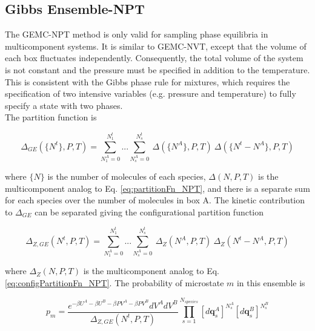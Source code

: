 \subsection{Gibbs Ensemble-NPT} 
\label{sec:gibbs_npt}

The GEMC-NPT method is only valid for sampling phase equilibria in multicomponent systems. 
It is similar to GEMC-NVT, except that the volume of each box fluctuates independently.
Consequently, the total volume of the system is not constant and the 
pressure must be specified in addition to the temperature.
This is consistent with the Gibbs phase rule for mixtures, which requires the specification of two intensive
variables (e.g. pressure and temperature) to fully specify a state with two phases. \\

The partition function is

\begin{equation}
\Delta_{GE}\left(\{N^t\},P,T\right) = \sum^{N^t_1}_{N^A_1=0} ... \sum^{N^t_s}_{N^A_s=0} 
                                    \ \Delta(\{N^A\},P,T)\ \Delta(\{N^t-N^A\},P,T)
\label{eq:partitionFn_GENPT}
\end{equation}

where $\{N\}$ is the number of molecules of each species,
$\Delta({N},P,T)$ is the multicomponent analog to Eq. \ref{eq:partitionFn_NPT}, and
there is a separate sum for each species over the number of molecules in box A.
The kinetic contribution to $\Delta_{GE}$ can be separated giving the configurational partition function

\begin{equation}
\Delta_{Z,GE}\left({N^t},P,T\right) = \sum^{N^t_1}_{N^A_1=0} ... \sum^{N^t_s}_{N^A_s=0} 
                                    \ \Delta_Z({N^A},P,T)\ \Delta_Z({N^t-N^A},P,T)
\label{eq:configPartitionFn_GENPT}
\end{equation}

where $\Delta_Z({N},P,T)$ is the multicomponent analog to Eq. \ref{eq:configPartitionFn_NPT}.
The probability of microstate $m$ in this ensemble is

\begin{equation}
p_m = \frac{e^{-\beta U^A -\beta U^B - \beta P V^A - \beta P V^B} dV^A dV^B}{\Delta_{Z,GE}({N^t},P,T)} 
      \prod_{s=1}^{N_{species}} \left[ d\mathbf{q}_s^{A} \right]^{N_s^A}
                                \left[ d\mathbf{q}_s^{B} \right]^{N_s^B}
\label{eq:pGENPT}
\end{equation}

